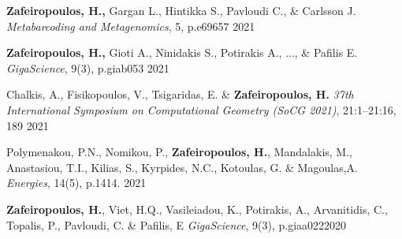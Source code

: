\documentclass[
	a4paper,
]{fortysecondscv}
\begin{document}


\begin{cvtable}

	{\textbf{Zafeiropoulos, H.,} Gargan L., Hintikka S., Pavloudi C., \& Carlsson J.}
	{\textit{Metabarcoding and Metagenomics}, 5, p.e69657}
	{2021}

	{\textbf{Zafeiropoulos, H.,} Gioti A., Ninidakis S., Potirakis A., ..., \& Pafilis E.}
	{\textit{GigaScience}, 9(3), p.giab053}
	{2021}
    
	{Chalkis, A., Fisikopoulos, V., Tsigaridas, E. \& \textbf{Zafeiropoulos, H.}}
	{\textit{37th International Symposium on Computational Geometry (SoCG 2021)}, 21:1--21:16, 189}
	{2021}
	
	{Polymenakou, P.N., Nomikou, P., \textbf{Zafeiropoulos, H.}, Mandalakis, M., Anastasiou, T.I., Kilias, S., Kyrpides, N.C., Kotoulas, G. \& Magoulas,A.}
	{\textit{Energies}, 14(5), p.1414.}
	{2021}



        {\textbf{Zafeiropoulos, H.}, Viet, H.Q., Vasileiadou, K., Potirakis, A., Arvanitidis, C., Topalis, P., Pavloudi, C. \& Pafilis, E}
	{\textit{GigaScience}, 9(3), p.giaa022}{2020}
	
\end{cvtable}


\newpage
\end{document}
